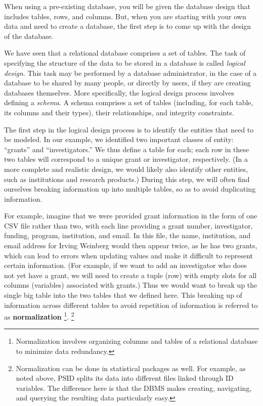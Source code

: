 \documentclass[]{krantz}
\begin{document}
When using a pre-existing database, you will be given the database
design that includes tables, rows, and columns. But, when you are
starting with your own data and need to create a database, the first
step is to come up with the design of the database.

We have seen that a relational database comprises a set of tables. The
task of specifying the structure of the data to be stored in a database
is called \emph{logical design}. This task may be performed by a
database administrator, in the case of a database to be shared by many
people, or directly by users, if they are creating databases themselves.
More specifically, the logical design process involves defining a
\emph{schema}. A schema comprises a set of tables (including, for each
table, its columns and their types), their relationships, and integrity
constraints.

The first step in the logical design process is to identify the entities
that need to be modeled. In our example, we identified two important
classes of entity: ``grants'' and ``investigators.'' We thus define a
table for each; each row in these two tables will correspond to a unique
grant or investigator, respectively. (In a more complete and realistic
design, we would likely also identify other entities, such as
institutions and research products.) During this step, we will often
find ourselves breaking information up into multiple tables, so as to
avoid duplicating information.

For example, imagine that we were provided grant information in the form
of one CSV file rather than two, with each line providing a grant
number, investigator, funding, program, institution, and email. In this
file, the name, institution, and email address for Irving Weinberg would
then appear twice, as he has two grants, which can lead to errors when
updating values and make it difficult to represent certain information.
(For example, if we want to add an investigator who does not yet have a
grant, we will need to create a tuple (row) with empty slots for all
columns (variables) associated with grants.) Thus we would want to break
up the single big table into the two tables that we defined here. This
breaking up of information across different tables to avoid repetition
of information is referred to as \textbf{normalization} \footnote{Normalization
  involves organizing columns and tables of a relational database to
  minimize data redundancy.}. \footnote{Normalization can be done in
  statistical packages as well. For example, as noted above, PSID splits
  its data into different files linked through ID variables. The
  difference here is that the DBMS makes creating, navigating, and
  querying the resulting data particularly easy.}
\end{document}
